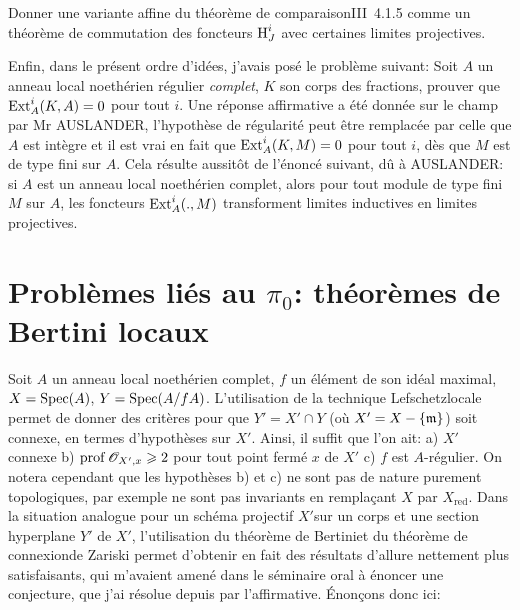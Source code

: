 \begin{probleme} \label{XIII.1.4}
Donner une variante affine du \og th\'eor\`eme de comparaison\fg \textup{\EGA III~4.1.5} comme un th\'eor\`eme de commutation des foncteurs $\operatorname{H}^i_J$ avec certaines limites projectives.
\end{probleme}

Enfin, dans le pr\'esent ordre d'id\'ees, j'avais pos\'e le probl\`eme suivant: Soit $A$ un anneau local noeth\'erien r\'egulier \emph{complet}, $K$ son corps des fractions, prouver que $\operatorname{Ext}^i_A(K, A)=0$ pour tout $i$. Une r\'eponse affirmative a \'et\'e donn\'ee sur le champ par Mr AUSLANDER, l'hypoth\`ese de r\'egularit\'e peut \^etre remplac\'ee par celle que $A$ est int\`egre et il est vrai en fait que $\operatorname{Ext}^i_A(K, M)=0$ pour tout $i$, d\`es que $M$ est de type fini sur $A$. Cela r\'esulte aussit\^{o}t de l'\'enonc\'e suivant, d\^u \`a AUSLANDER: si $A$ est un anneau local noeth\'erien complet, alors pour tout module de type fini $M$ sur $A$, les foncteurs $\operatorname{Ext}_A^i(., M)$ transforment limites inductives en limites projectives.

\section{Probl\`emes li\'es au $\pi_0$: th\'eor\`emes de Bertini locaux} \label{XIII.2}

Soit $A$ un anneau local noeth\'erien complet, $f$ un \'el\'ement de son
id\'eal maximal, $X=\operatorname{Spec} (A)$, $Y=\operatorname{Spec}(A/fA)$. L'utilisation de la
technique \og Lefschetz\fg locale permet de donner des crit\`eres
pour que $Y'=X'\cap Y$ (o\`u $X'=X-\{\mathfrak{m}\}$) soit connexe, en termes
d'hypoth\`eses sur $X'$. Ainsi, il suffit que l'on ait: a) $X'$
connexe b) $\operatorname{prof} {\mathscr O}_{X', x} \geqslant 2$ pour tout point ferm\'e $x$
de $X'$ c) $f$ est $A$-r\'egulier. On notera cependant que les
hypoth\`eses b) et c) ne sont pas de nature purement
topologiques, par exemple ne sont pas invariants en
rempla\c cant $X$ par $X_{\text{red}}$. Dans la situation analogue
pour un sch\'ema projectif $X'$sur un corps et une section
hyperplane $Y'$ de $X'$, l'utilisation du \og th\'eor\`eme de
Bertini\fg et du \og th\'eor\`eme de connexion\fg de Zariski permet
d'obtenir en fait des r\'esultats d'allure nettement plus
satisfaisants, qui m'avaient amen\'e dans le s\'eminaire oral \`a
\'enoncer une conjecture, que j'ai r\'esolue depuis par l'affirmative.
\'Enon\c cons donc ici:


